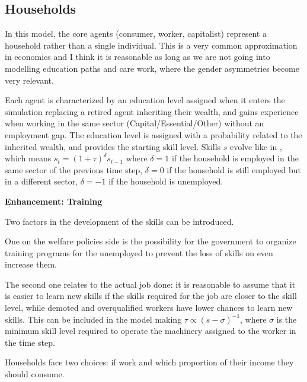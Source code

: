 \documentclass[a4paper, headings=standardclasses]{scrartcl}
\newenvironment{enh}[1][]{\begin{framed}\noindent\textbf{Enhancement: #1}\par}{\end{framed}}
\begin{document}
\subsection{Households}
In this model, the core agents (consumer, worker, capitalist) represent a household rather than a single individual. This is a very common approximation in economics and I think it is reasonable as long as we are not going into modelling education paths and care work, where the gender asymmetries become very relevant.

Each agent is characterized by an education level assigned when it enters the simulation replacing a retired agent inheriting their wealth, and gains experience when working in the same sector (Capital/Essential/Other) without an employment gap.
The education level is assigned with a probability related to the inherited wealth, and provides the starting skill level.
Skills $s$ evolve like in \textcite{dosi2018}, which means $s_t = (1+\tau)^\delta s_{t-1}$ where $\delta=1$ if the household is employed in the same sector of the previous time step, $\delta=0$ if the household is still employed but in a different sector, $\delta=-1$ if the household is unemployed.

\begin{enh}[Training]
	Two factors in the development of the skills can be introduced.

	One on the welfare policies side is the possibility for the government to organize training programs for the unemployed to prevent the loss of skills on even increase them.

	The second one relates to the actual job done: it is reasonable to assume that it is easier to learn new skills if the skills required for the job are closer to the skill level, while demoted and overqualified workers have lower chances to learn new skills. This can be included in the model making $\tau \propto (s-\sigma)^{-1}$, where $\sigma$ is the minimum skill level required to operate the machinery assigned to the worker in the time step.
\end{enh}

Households face two choices: if work and which proportion of their income they should consume.
\end{document}
